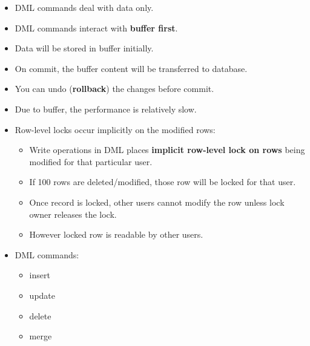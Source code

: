 
\begin{flushleft}
	
	\begin{itemize}
		\item DML commands deal with data only.
		\item DML commands interact with \textbf{buffer first}.
		\item Data will be stored in buffer initially.
		\item On commit, the buffer content will be transferred to database.
		\item You can undo (\textbf{rollback}) the changes before commit.
		\item Due to buffer, the performance is relatively slow.
		\item Row-level locks occur implicitly on the modified rows:
		\begin{itemize}
			\item Write operations in DML places \textbf{implicit row-level lock on rows} being modified for that particular user. 
			\item If 100 rows are deleted/modified, those row will be locked for that user. \item Once record is locked, other users cannot modify the row unless lock owner releases the lock. 
			\item However locked row is readable by other users.
		\end{itemize}
		
		
		\item DML commands:
		\begin{itemize}
			\item insert
			\item update
			\item delete
			\item merge
		\end{itemize}
		
	\end{itemize}
	
\end{flushleft}

\newpage